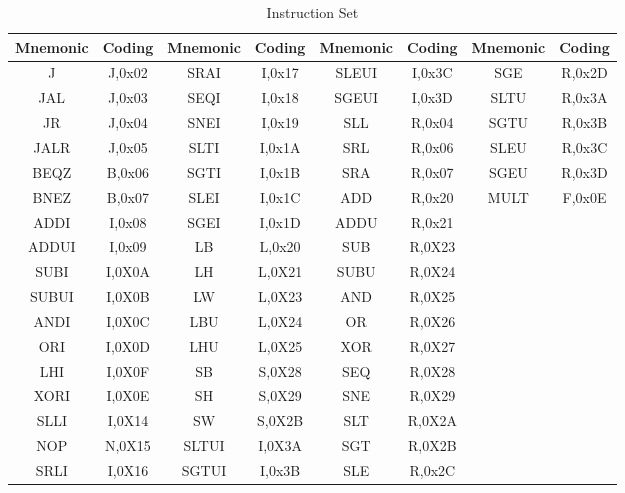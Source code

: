 \begin{table}[ht]                                   
	\centering                                         
	\begin{tabular}{|c|c|c|c|c|c|c|c|}                                         
	\toprule                                                         
	Mnemonic & Coding & Mnemonic & Coding & Mnemonic & Coding & Mnemonic & Coding\\                                              
	\midrule                                                          
	J		& J,0x02 	& SRAI	& I,0x17	& SLEUI	& I,0x3C	& SGE	& R,0x2D\\                                              
	JAL		& J,0x03 	& SEQI	& I,0x18	& SGEUI	& I,0x3D	& SLTU	& R,0x3A\\                                          
	JR		& J,0x04 	& SNEI	& I,0x19	& SLL	& R,0x04	& SGTU 	& R,0x3B\\						      
	JALR	& J,0x05 	& SLTI	& I,0x1A  	& SRL 	& R,0x06    & SLEU 	& R,0x3C\\                               
	BEQZ 	& B,0x06 	& SGTI 	& I,0x1B  	& SRA 	& R,0x07    & SGEU	& R,0x3D\\                               
	BNEZ 	& B,0x07 	& SLEI 	& I,0x1C  	& ADD	& R,0x20    & MULT	& F,0x0E\\                            
	ADDI	& I,0x08 	& SGEI	& I,0x1D  	& ADDU	& R,0x21	&&				\\     	                            
	ADDUI	& I,0x09 	& LB	& L,0x20  	& SUB	& R,0X23	&&				\\      
	SUBI	& I,0X0A 	& LH	& L,0X21  	& SUBU	& R,0X24	&&				\\      
    SUBUI   & I,0X0B 	& LW	& L,0X23  	& AND  	& R,0X25	&&				\\      
    ANDI    & I,0X0C 	& LBU  	& L,0X24  	& OR 	& R,0X26	&&				\\        
    ORI     & I,0X0D 	& LHU   & L,0X25  	& XOR   & R,0X27	&&				\\    
    LHI		& I,0X0F    & SB  	& S,0X28    & SEQ  	& R,0X28	&&				\\
	XORI    & I,0X0E 	& SH	& S,0X29  	& SNE	& R,0X29	&&				\\      
    SLLI    & I,0X14 	& SW   	& S,0X2B  	& SLT  	& R,0X2A	&&				\\      
    NOP     & N,0X15 	& SLTUI	& I,0X3A  	& SGT	& R,0X2B	&&				\\        
	SRLI	& I,0X16 	& SGTUI	& I,0x3B	& SLE	& R,0x2C	&&				\\										
	\bottomrule                                         
	\end{tabular}                                       
	\caption{Instruction Set}                           
	\label{tableIS} %
\end{table}       


